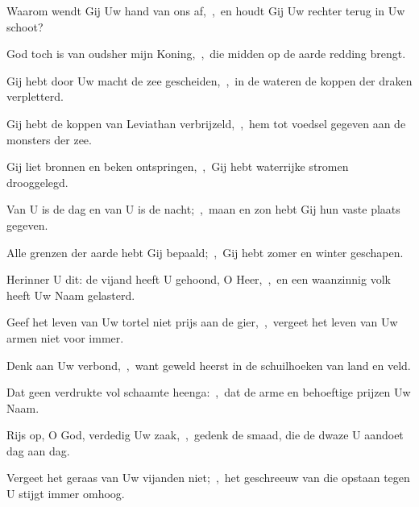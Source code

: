 \documentclass[12pt,twoside,a5paper]{article}
\begin{document}
\begin{halfparskip}
  Waarom wendt Gij Uw hand van ons af,~\sep\ en houdt Gij Uw rechter terug in Uw schoot?

  God toch is van oudsher mijn Koning,~\sep\ die midden op de aarde redding brengt.

  Gij hebt door Uw macht de zee gescheiden,~\sep\ in de wateren de koppen der draken verpletterd.

  Gij hebt de koppen van Leviathan verbrijzeld,~\sep\ hem tot voedsel gegeven aan de monsters der zee.

  Gij liet bronnen en beken ontspringen,~\sep\ Gij hebt waterrijke stromen drooggelegd.

  Van U is de dag en van U is de nacht;~\sep\ maan en zon hebt Gij hun vaste plaats gegeven.

  Alle grenzen der aarde hebt Gij bepaald;~\sep\ Gij hebt zomer en winter geschapen.

  Herinner U dit: de vijand heeft U gehoond, O Heer,~\sep\ en een waanzinnig volk heeft Uw Naam gelasterd.

  Geef het leven van Uw tortel niet prijs aan de gier,~\sep\ vergeet het leven van Uw armen niet voor immer.

  Denk aan Uw verbond,~\sep\ want geweld heerst in de schuilhoeken van land en veld.

  Dat geen verdrukte vol schaamte heenga:~\sep\ dat de arme en behoeftige prijzen Uw Naam.

  Rijs op, O God, verdedig Uw zaak,~\sep\ gedenk de smaad, die de dwaze U aandoet dag aan dag.

  Vergeet het geraas van Uw vijanden niet;~\sep\ het geschreeuw van die opstaan tegen U stijgt immer omhoog.
\end{halfparskip}

\end{document}
